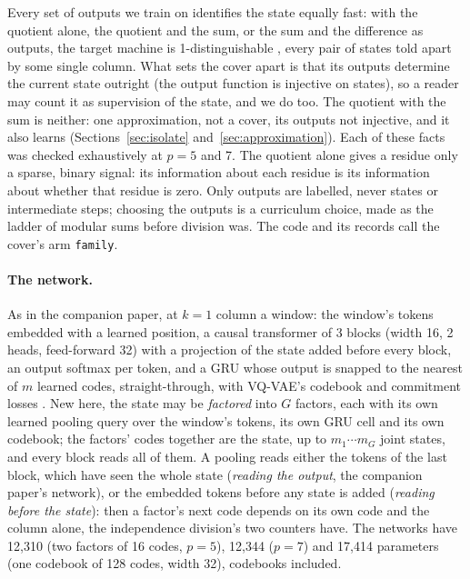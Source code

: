 \documentclass[11pt]{article}
\begin{document}
Every set of outputs we train on identifies the state equally fast: with the quotient alone, the
quotient and the sum, or the sum and the difference as outputs, the target machine is
1-distinguishable \citep{chow-1978-testing-software-design-finite-state-machines}, every pair of
states told apart by some single column. What sets the cover apart is that its outputs determine
the current state outright (the output function is injective on states), so a reader may count it as
supervision of the state, and we do too. The quotient with the sum is neither: one approximation, not
a cover, its outputs not injective, and it also learns (Sections~\ref{sec:isolate}
and~\ref{sec:approximation}). Each of these
facts was checked exhaustively at $p = 5$ and 7. The quotient alone gives a residue only a sparse,
binary signal: its information about each residue is its information about whether that residue is
zero. Only outputs are labelled, never states or intermediate steps; choosing the outputs is a
curriculum choice, made as the ladder of modular sums before division was. The code and its records
call the cover's arm \texttt{family}.

\paragraph{The network.} As in the companion paper, at $k = 1$ column a window: the window's tokens
embedded with a learned position, a causal transformer of 3 blocks (width 16, 2 heads, feed-forward
32) with a projection of the state added before every block, an output softmax per token, and a GRU
whose output is snapped to the nearest of $m$ learned codes, straight-through, with VQ-VAE's codebook
and commitment losses \citep{van-den-oord-2017-vq-vae-neural-discrete-representation}. New here, the
state may be \emph{factored} into $G$ factors, each with its own learned pooling query over the
window's tokens, its own GRU cell and its own codebook; the factors' codes together are the state,
up to $m_1 \cdots m_G$ joint states, and every block reads all of them. A pooling reads either the
tokens of the last block, which have seen the whole state (\emph{reading the output}, the companion
paper's network), or the embedded tokens before any state is added (\emph{reading before the
state}): then a factor's next code depends on its own code and the column alone, the independence
division's two counters have. The networks have 12{,}310 (two factors of 16 codes, $p = 5$),
12{,}344 ($p = 7$) and 17{,}414 parameters (one codebook of 128 codes, width 32), codebooks
included.
\end{document}
